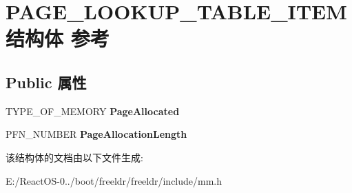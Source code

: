 \hypertarget{struct_p_a_g_e___l_o_o_k_u_p___t_a_b_l_e___i_t_e_m}{}\section{P\+A\+G\+E\+\_\+\+L\+O\+O\+K\+U\+P\+\_\+\+T\+A\+B\+L\+E\+\_\+\+I\+T\+E\+M结构体 参考}
\label{struct_p_a_g_e___l_o_o_k_u_p___t_a_b_l_e___i_t_e_m}
\subsection*{Public 属性}
\begin{DoxyCompactItemize}
\item 
\mbox{\label{struct_p_a_g_e___l_o_o_k_u_p___t_a_b_l_e___i_t_e_m_ad85abacec2705d80b25736551a5e6398}} 
T\+Y\+P\+E\+\_\+\+O\+F\+\_\+\+M\+E\+M\+O\+RY {\bfseries Page\+Allocated}
\item 
\mbox{\label{struct_p_a_g_e___l_o_o_k_u_p___t_a_b_l_e___i_t_e_m_a8cf43529e9cf88dafd759aedc0e3654d}} 
P\+F\+N\+\_\+\+N\+U\+M\+B\+ER {\bfseries Page\+Allocation\+Length}
\end{DoxyCompactItemize}


该结构体的文档由以下文件生成\+:\begin{DoxyCompactItemize}
\item 
E\+:/\+React\+O\+S-\/0../boot/freeldr/freeldr/include/mm.\+h\end{DoxyCompactItemize}

